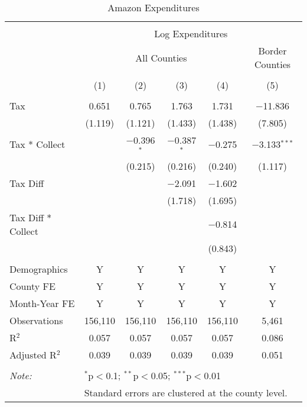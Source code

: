 
\begin{table}[!htbp] \centering 
  \caption{Amazon Expenditures} 
  \label{tab:amazonExp} 
\begin{tabular}{@{\extracolsep{5pt}}lccccc} 
\\[-1.8ex]\hline 
\hline \\[-1.8ex] 
 & \multicolumn{5}{c}{Log Expenditures} \\ 
\cline{2-6} 
 & \multicolumn{4}{c}{All Counties} & Border Counties \\ 
\\[-1.8ex] & (1) & (2) & (3) & (4) & (5)\\ 
\hline \\[-1.8ex] 
 Tax & 0.651 & 0.765 & 1.763 & 1.731 & $-$11.836 \\ 
  & (1.119) & (1.121) & (1.433) & (1.438) & (7.805) \\ 
  Tax * Collect &  & $-$0.396$^{*}$ & $-$0.387$^{*}$ & $-$0.275 & $-$3.133$^{***}$ \\ 
  &  & (0.215) & (0.216) & (0.240) & (1.117) \\ 
  Tax Diff &  &  & $-$2.091 & $-$1.602 &  \\ 
  &  &  & (1.718) & (1.695) &  \\ 
  Tax Diff * Collect &  &  &  & $-$0.814 &  \\ 
  &  &  &  & (0.843) &  \\ 
 \hline \\[-1.8ex] 
Demographics & Y & Y & Y & Y & Y \\ 
County FE & Y & Y & Y & Y & Y \\ 
Month-Year FE & Y & Y & Y & Y & Y \\ 
Observations & 156,110 & 156,110 & 156,110 & 156,110 & 5,461 \\ 
R$^{2}$ & 0.057 & 0.057 & 0.057 & 0.057 & 0.086 \\ 
Adjusted R$^{2}$ & 0.039 & 0.039 & 0.039 & 0.039 & 0.051 \\ 
\hline 
\hline \\[-1.8ex] 
\textit{Note:}  & \multicolumn{5}{l}{$^{*}$p$<$0.1; $^{**}$p$<$0.05; $^{***}$p$<$0.01} \\ 
 & \multicolumn{5}{l}{Standard errors are clustered at the county level.} \\ 
\end{tabular} 
\end{table} 

